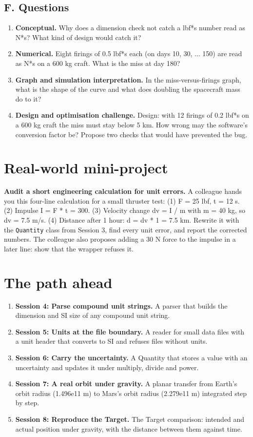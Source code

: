 \documentclass[11pt,a4paper]{article}
\begin{document}
\subsection*{F. Questions}
\begin{enumerate}[nosep]
\item \textbf{Conceptual.} Why does a dimension check not catch a lbf*s number read as N*s? What kind of design would catch it?
\item \textbf{Numerical.} Eight firings of 0.5 lbf*s each (on days 10, 30, ... 150) are read as N*s on a 600 kg craft. What is the miss at day 180?
\item \textbf{Graph and simulation interpretation.} In the miss-versus-firings graph, what is the shape of the curve and what does doubling the spacecraft mass do to it?
\item \textbf{Design and optimisation challenge.} Design: with 12 firings of 0.2 lbf*s on a 600 kg craft the miss must stay below 5 km. How wrong may the software's conversion factor be? Propose two checks that would have prevented the bug.
\end{enumerate}

\section{Real-world mini-project}
\textbf{Audit a short engineering calculation for unit errors.} A colleague hands you this four-line calculation for a small thruster test: (1) F = 25 lbf, t = 12 s. (2) Impulse I = F * t = 300. (3) Velocity change dv = I / m with m = 40 kg, so dv = 7.5 m/s. (4) Distance after 1 hour: d = dv * 1 = 7.5 km. Rewrite it with the \texttt{Quantity} class from Session 3, find every unit error, and report the corrected numbers. The colleague also proposes adding a 30 N force to the impulse in a later line: show that the wrapper refuses it.

\section{The path ahead}
\begin{enumerate}[nosep]
\item \textbf{Session 4: Parse compound unit strings.} A parser that builds the dimension and SI size of any compound unit string.
\item \textbf{Session 5: Units at the file boundary.} A reader for small data files with a unit header that converts to SI and refuses files without units.
\item \textbf{Session 6: Carry the uncertainty.} A Quantity that stores a value with an uncertainty and updates it under multiply, divide and power.
\item \textbf{Session 7: A real orbit under gravity.} A planar transfer from Earth's orbit radius (1.496e11 m) to Mars's orbit radius (2.279e11 m) integrated step by step.
\item \textbf{Session 8: Reproduce the Target.} The Target comparison: intended and actual position under gravity, with the distance between them against time.
\end{enumerate}
\end{document}
